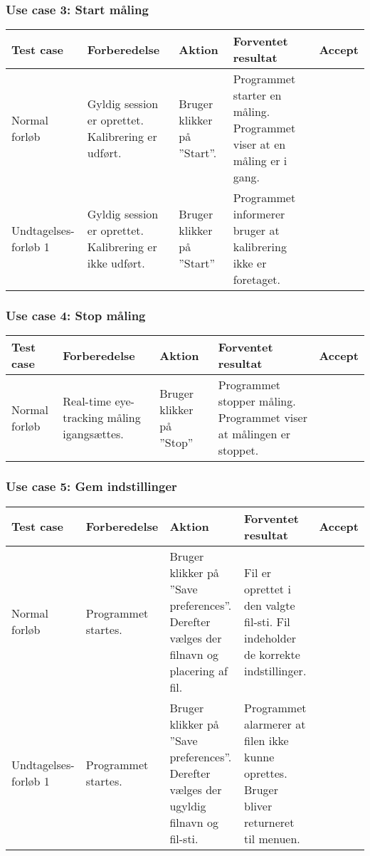 \documentclass[accepttest.tex]{subfiles}
\begin{document}
\subsubsection{Use case 3: Start måling}
\begin{table}[H]
	\small
	\begin{tabular}{|p{2cm}|p{3cm}|p{3cm}|p{3cm}|l|}
		\hline Test case & Forberedelse & Aktion & Forventet resultat & Accept \\ 
		\hline Normal forløb & Gyldig session er oprettet. Kalibrering er udført.  & Bruger klikker på ”Start”.   & Programmet starter en måling. Programmet viser at en måling er i gang. & \\
		
		\hline Undtagelses-forløb 1 & Gyldig session er oprettet. Kalibrering er ikke udført. & Bruger klikker på ”Start” & Programmet informerer bruger at kalibrering ikke er foretaget.  &\\
		\hline 
	\end{tabular}
\end{table}

\subsubsection{Use case 4: Stop måling}
\begin{table}[H]
	\small
	\begin{tabular}{|p{2cm}|p{3cm}|p{3cm}|p{3cm}|l|}
		\hline Test case & Forberedelse & Aktion & Forventet resultat & Accept \\ 
		\hline Normal forløb & Real-time eye-tracking måling igangsættes. & Bruger klikker på ”Stop” & Programmet stopper måling. Programmet viser at målingen er stoppet.  & \\
		\hline 
	\end{tabular}
\end{table}

\subsubsection{Use case 5: Gem indstillinger}
\begin{table}[H]
	\small
	\begin{tabular}{|p{2cm}|p{3cm}|p{3cm}|p{3cm}|l|}
		\hline Test case & Forberedelse & Aktion & Forventet resultat & Accept \\ 
		\hline Normal forløb & Programmet startes. & Bruger klikker på ”Save preferences”. Derefter vælges der filnavn og placering af fil. & Fil er oprettet i den valgte fil-sti. Fil indeholder de korrekte indstillinger. & \\
		
		\hline Undtagelses-forløb 1 & Programmet startes. & Bruger klikker på ”Save preferences”. Derefter vælges der ugyldig filnavn og fil-sti. & Programmet alarmerer at filen ikke kunne oprettes. Bruger bliver returneret til menuen. &\\
		\hline 
	\end{tabular}
\end{table}
\end{document}
